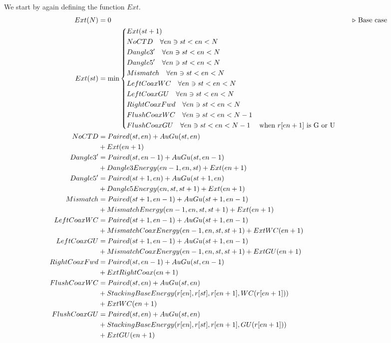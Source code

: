 \documentclass{cshonours}
\begin{document}
We start by again defining the function $Ext$.
\begin{align*}
Ext(N) &= 0 & \quad \triangleright \text{ Base case} \\
Ext(st) &= \min{\begin{dcases*}
  Ext(st + 1) & \\
  NoCTD \quad \forall en \ni st < en < N & \\
  Dangle3' \quad \forall en \ni st < en < N & \\
  Dangle5' \quad \forall en \ni st < en < N & \\
  Mismatch \quad \forall en \ni st < en < N & \\
  LeftCoaxWC \quad \forall en \ni st < en < N & \\
  LeftCoaxGU \quad \forall en \ni st < en < N &  \\
  RightCoaxFwd \quad \forall en \ni st < en < N & \\
  FlushCoaxWC \quad \forall en \ni st < en < N - 1 & \\
  FlushCoaxGU \quad \forall en \ni st < en < N - 1 & when $r[en + 1]$ is G or U \\
\end{dcases*}} \\
NoCTD &= Paired(st, en) + AuGu(st, en) \\
  &+ Ext(en + 1) \\
Dangle3' &= Paired(st, en - 1) + AuGu(st, en - 1) \\
  &+ Dangle3Energy(en - 1, en, st) + Ext(en + 1) \\
Dangle5' &= Paired(st + 1, en) + AuGu(st + 1, en) \\
  &+ Dangle5Energy(en, st, st + 1) + Ext(en + 1) \\
Mismatch &= Paired(st + 1, en - 1) + AuGu(st + 1, en - 1) \\
  &+ MismatchEnergy(en - 1, en, st, st + 1) + Ext(en + 1) \\
LeftCoaxWC &= Paired(st + 1, en - 1) + AuGu(st + 1, en - 1) \\
  &+ MismatchCoaxEnergy(en - 1, en, st, st + 1) + ExtWC(en + 1) \\
LeftCoaxGU &= Paired(st + 1, en - 1) + AuGu(st + 1, en - 1) \\
  &+ MismatchCoaxEnergy(en - 1, en, st, st + 1) + ExtGU(en + 1) \\
RightCoaxFwd &= Paired(st, en - 1) + AuGu(st, en - 1) \\
  &+ ExtRightCoax(en + 1) \\
FlushCoaxWC &= Paired(st, en) + AuGu(st, en) \\
  &+ StackingBaseEnergy(r[en], r[st], r[en + 1], WC(r[en + 1])) \\
  & + ExtWC(en + 1) \\
FlushCoaxGU &= Paired(st, en) + AuGu(st, en) \\
  &+ StackingBaseEnergy(r[en], r[st], r[en + 1], GU(r[en + 1])) \\
  &+ ExtGU(en + 1) \\
\end{align*}
\end{document}

